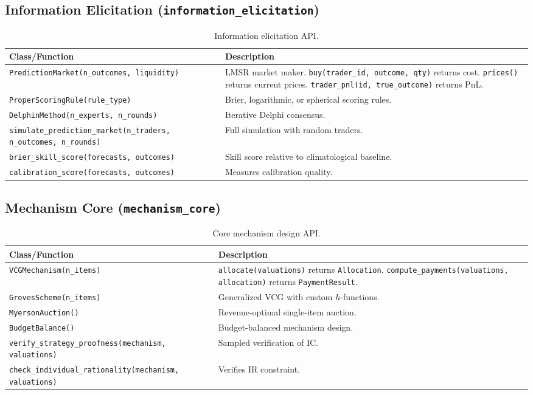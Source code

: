 \documentclass[10pt]{article}
\begin{document}
\subsection{Information Elicitation (\texttt{information\_elicitation})}

\begin{table}[H]
\centering
\caption{Information elicitation API.}
\label{tab:api-info}
\begin{tabularx}{\textwidth}{lX}
\toprule
\textbf{Class/Function} & \textbf{Description} \\
\midrule
\texttt{PredictionMarket(n\_outcomes, liquidity)} & LMSR market maker. \texttt{buy(trader\_id, outcome, qty)} returns cost. \texttt{prices()} returns current prices. \texttt{trader\_pnl(id, true\_outcome)} returns PnL. \\
\texttt{ProperScoringRule(rule\_type)} & Brier, logarithmic, or spherical scoring rules. \\
\texttt{DelphinMethod(n\_experts, n\_rounds)} & Iterative Delphi consensus. \\
\texttt{simulate\_prediction\_market(n\_traders, n\_outcomes, n\_rounds)} & Full simulation with random traders. \\
\texttt{brier\_skill\_score(forecasts, outcomes)} & Skill score relative to climatological baseline. \\
\texttt{calibration\_score(forecasts, outcomes)} & Measures calibration quality. \\
\bottomrule
\end{tabularx}
\end{table}

\subsection{Mechanism Core (\texttt{mechanism\_core})}

\begin{table}[H]
\centering
\caption{Core mechanism design API.}
\label{tab:api-core}
\begin{tabularx}{\textwidth}{lX}
\toprule
\textbf{Class/Function} & \textbf{Description} \\
\midrule
\texttt{VCGMechanism(n\_items)} & \texttt{allocate(valuations)} returns \texttt{Allocation}. \texttt{compute\_payments(valuations, allocation)} returns \texttt{PaymentResult}. \\
\texttt{GrovesScheme(n\_items)} & Generalized VCG with custom $h$-functions. \\
\texttt{MyersonAuction()} & Revenue-optimal single-item auction. \\
\texttt{BudgetBalance()} & Budget-balanced mechanism design. \\
\texttt{verify\_strategy\_proofness(mechanism, valuations)} & Sampled verification of IC. \\
\texttt{check\_individual\_rationality(mechanism, valuations)} & Verifies IR constraint. \\
\bottomrule
\end{tabularx}
\end{table}
\end{document}
